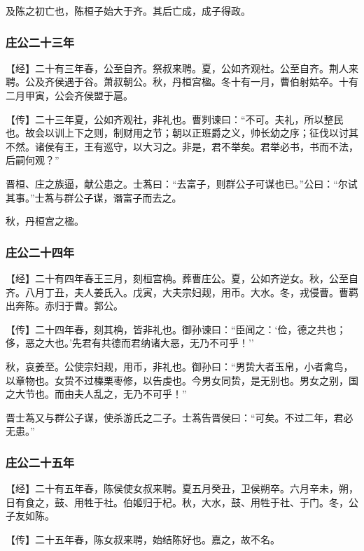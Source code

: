 \documentclass[]{article}
\begin{document}
及陈之初亡也，陈桓子始大于齐。其后亡成，成子得政。

\hypertarget{header-n527}{%
\subsubsection{庄公二十三年}\label{header-n527}}

【经】二十有三年春，公至自齐。祭叔来聘。夏，公如齐观社。公至自齐。荆人来聘。公及齐侯遇于谷。萧叔朝公。秋，丹桓宫楹。冬十有一月，曹伯射姑卒。十有二月甲寅，公会齐侯盟于扈。

【传】二十三年夏，公如齐观社，非礼也。曹刿谏曰：``不可。夫礼，所以整民也。故会以训上下之则，制财用之节；朝以正班爵之义，帅长幼之序；征伐以讨其不然。诸侯有王，王有巡守，以大习之。非是，君不举矣。君举必书，书而不法，后嗣何观？''

晋桓、庄之族逼，献公患之。士蒍曰：``去富子，则群公子可谋也已。''公曰：``尔试其事。''士蒍与群公子谋，谮富子而去之。

秋，丹桓宫之楹。

\hypertarget{header-n534}{%
\subsubsection{庄公二十四年}\label{header-n534}}

【经】二十有四年春王三月，刻桓宫桷。葬曹庄公。夏，公如齐逆女。秋，公至自齐。八月丁丑，夫人姜氏入。戊寅，大夫宗妇觌，用币。大水。冬，戎侵曹。曹羁出奔陈。赤归于曹。郭公。

【传】二十四年春，刻其桷，皆非礼也。御孙谏曰：``臣闻之：`俭，德之共也；侈，恶之大也。'先君有共德而君纳诸大恶，无乃不可乎！''

秋，哀姜至。公使宗妇觌，用币，非礼也。御孙曰：``男贽大者玉帛，小者禽鸟，以章物也。女贽不过榛栗枣修，以告虔也。今男女同贽，是无别也。男女之别，国之大节也。而由夫人乱之，无乃不可乎！''

晋士蒍又与群公子谋，使杀游氏之二子。士蒍告晋侯曰：``可矣。不过二年，君必无患。''

\hypertarget{header-n541}{%
\subsubsection{庄公二十五年}\label{header-n541}}

【经】二十有五年春，陈侯使女叔来聘。夏五月癸丑，卫侯朔卒。六月辛未，朔，日有食之，鼓、用牲于社。伯姬归于杞。秋，大水，鼓、用牲于社、于门。冬，公子友如陈。

【传】二十五年春，陈女叔来聘，始结陈好也。嘉之，故不名。
\end{document}
